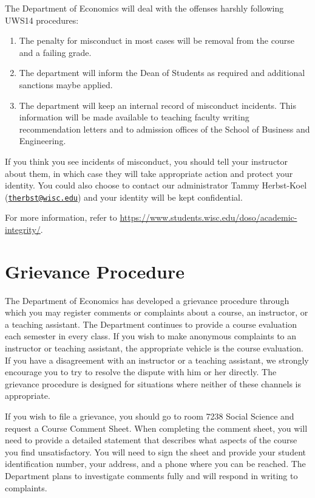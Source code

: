 \documentclass[
]{book}
\begin{document}
The Department of Economics will deal with the offenses harshly following UWS14 procedures:

\begin{enumerate}
\def\labelenumi{\arabic{enumi}.}
\item
  The penalty for misconduct in most cases will be removal from the course and a failing grade.
\item
  The department will inform the Dean of Students as required and additional sanctions maybe applied.
\item
  The department will keep an internal record of misconduct incidents. This information will be made available to teaching faculty writing recommendation letters and to admission offices of the School of Business and Engineering.
\end{enumerate}

If you think you see incidents of misconduct, you should tell your instructor about them, in which case they will take appropriate action and protect your identity. You could also choose to contact our administrator Tammy Herbst-Koel (\href{mailto:therbst@wisc.edu}{\nolinkurl{therbst@wisc.edu}}) and your identity will be kept confidential.

For more information, refer to \url{https://www.students.wisc.edu/doso/academic-integrity/}.

\hypertarget{grievance-procedure}{%
\section{Grievance Procedure}\label{grievance-procedure}}

The Department of Economics has developed a grievance procedure through which you may register comments or complaints about a course, an instructor, or a teaching assistant. The Department continues to provide a course evaluation each semester in every class. If you wish to make anonymous complaints to an instructor or teaching assistant, the appropriate vehicle is the course evaluation. If you have a disagreement with an instructor or a teaching assistant, we strongly encourage you to try to resolve the dispute with him or her directly. The grievance procedure is designed for situations where neither of these channels is appropriate.

If you wish to file a grievance, you should go to room 7238 Social Science and request a Course Comment Sheet. When completing the comment sheet, you will need to provide a detailed statement that describes what aspects of the course you find unsatisfactory. You will need to sign the sheet and provide your student identification number, your address, and a phone where you can be reached. The Department plans to investigate comments fully and will respond in writing to complaints.
\end{document}
